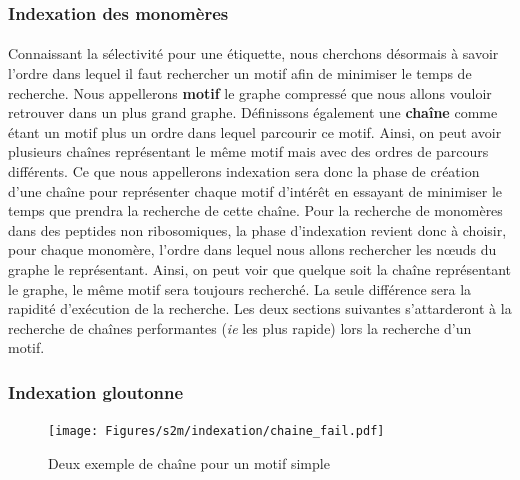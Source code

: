 \documentclass[12pt,french,twoside]{report}
\begin{document}
\subsubsection{Indexation des monomères}

\label{index_p}

\paragraph{}Connaissant la sélectivité pour une étiquette, nous cherchons désormais à savoir l'ordre dans lequel il faut rechercher
un motif afin de minimiser le temps de recherche.
Nous appellerons \textbf{motif} le graphe compressé que nous allons vouloir retrouver dans un plus
grand graphe. Définissons également une \textbf{chaîne} comme étant un motif plus un ordre dans lequel parcourir ce motif. Ainsi,
on peut avoir plusieurs chaînes représentant le même motif mais avec des ordres de parcours différents. Ce que nous appellerons
indexation sera donc la phase de création d'une chaîne pour représenter chaque motif d'intérêt en essayant de minimiser le temps
que prendra la recherche de cette chaîne. Pour la recherche de monomères dans
des peptides non ribosomiques, la phase d'indexation revient donc à choisir, pour chaque monomère, l'ordre dans lequel nous allons
rechercher les n\oe{}uds du graphe le représentant. Ainsi, on peut voir que quelque soit la chaîne représentant le graphe, le même
motif sera toujours recherché. La seule différence sera la rapidité d'exécution de la recherche. Les deux sections suivantes
s'attarderont à la recherche de chaînes performantes (\textit{ie} les plus rapide) lors la recherche d'un motif.


\subsubsection{Indexation gloutonne}

\begin{figure}[!ht]
  \texttt{[image: Figures/s2m/indexation/chaine\_fail.pdf]}
  \caption{\label{chaine_fail}Deux exemple de chaîne pour un motif simple}
\end{figure}
\end{document}
